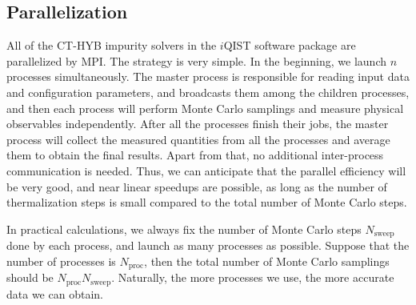 \subsection{Parallelization}
All of the CT-HYB impurity solvers in the $i$QIST software package are parallelized by MPI. The strategy is very simple. In the beginning, we launch $n$ processes simultaneously. The master process is responsible for reading input data and configuration parameters, and broadcasts them among the children processes, and then each process will perform Monte Carlo samplings and measure physical observables independently. After all the processes finish their jobs, the master process will collect the measured quantities from all the processes and average them to obtain the final results. Apart from that, no additional inter-process communication is needed. Thus, we can anticipate that the parallel efficiency will be very good, and near linear speedups are possible, as long as the number of thermalization steps is small compared to the total number of Monte Carlo steps. 

In practical calculations, we always fix the number of Monte Carlo steps $N_{\text{sweep}}$ done by each process, and launch as many processes as possible. Suppose that the number of processes is $N_{\text{proc}}$, then the total number of Monte Carlo samplings should be $N_{\text{proc}}N_{\text{sweep}}$. Naturally, the more processes we use, the more accurate data we can obtain.
